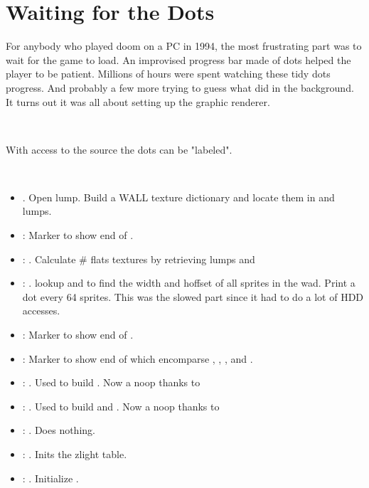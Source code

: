 \section{Waiting for the Dots}
\label{dots_explained}
For anybody who played doom on a PC in 1994, the most frustrating part was to wait for the game to load. An improvised progress bar made of dots helped the player to be patient. Millions of hours were spent watching these tidy dots progress. And probably a few more trying to guess what  did in the background. It turns out it was all about setting up the graphic renderer.\\
\par
{}\\
\par
With access to the source the dots can be "labeled".\\
\par
{}\\
\par
\begin{itemize}
\item {} . Open  lump. Build a WALL texture dictionary and locate them in  and  lumps.
\item {}: Marker to show end of .
\item {}: . Calculate \# flats textures by retrieving lumps  and 
\item {}: . lookup  and  to find the width and hoffset of all sprites in the wad. Print a dot every 64 sprites. This was the slowed part since it had to do a lot of HDD accesses.
\item {}: Marker to show end of . 
\item {}: Marker to show end of  which encomparse  , , , and .
\item {}: . Used to build . Now a noop thanks to 
\item {}: . Used to build  and . Now a noop thanks to 
\item {}: . Does nothing. 
\item {}: . Inits the zlight table.
\item {}: . Initialize .
\end{itemize}

